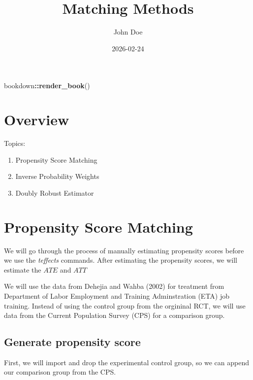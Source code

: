 \documentclass[
]{book}
\title{Matching Methods}
\author{John Doe}
\date{2026-02-24}
\newenvironment{Shaded}{\begin{snugshade}}{\end{snugshade}}
\newcommand{\FunctionTok}[1]{\textcolor[rgb]{0.13,0.29,0.53}{\textbf{#1}}}
\newcommand{\NormalTok}[1]{#1}
\newcommand{\SpecialCharTok}[1]{\textcolor[rgb]{0.81,0.36,0.00}{\textbf{#1}}}
\providecommand{\tightlist}{%
  \setlength{\itemsep}{0pt}\setlength{\parskip}{0pt}}
\begin{document}
\maketitle

{
\setcounter{tocdepth}{1}
\tableofcontents
}
\begin{Shaded}
\begin{Highlighting}[]
\NormalTok{bookdown}\SpecialCharTok{::}\FunctionTok{render\_book}\NormalTok{()}
\end{Highlighting}
\end{Shaded}

\chapter*{Overview}\label{overview}

Topics:

\begin{enumerate}
\def\labelenumi{\arabic{enumi}.}
\tightlist
\item
  Propensity Score Matching
\item
  Inverse Probability Weights
\item
  Doubly Robust Estimator
\end{enumerate}

\chapter{Propensity Score Matching}\label{propensity-score-matching}

We will go through the process of manually estimating propensity scores before we use the \emph{teffects} commands. After estimating the propensity scores, we will estimate the \(ATE\) and \(ATT\)

We will use the data from Dehejia and Wahba (2002) for treatment from Department of Labor Employment and Training Adminstration (ETA) job training. Instead of using the control group from the orgininal RCT, we will use data from the Current Population Survey (CPS) for a comparison group.

\section{Generate propensity score}\label{generate-propensity-score}

First, we will import and drop the experimental control group, so we can append our comparison group from the CPS.
\end{document}
